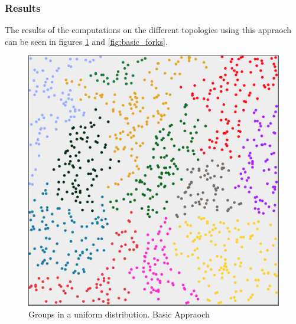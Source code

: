 \subsubsection{Results}
The results of the computations on the different topologies using this appraoch can be seen in figures \ref{fig:basic_uniform} and  \ref{fig:basic_forks}.
 
\begin{figure}[h]
	\center
	\includegraphics[scale=0.46]{Images/computations/BASIC500x500_1000n.jpg}
	\caption{Groups in a uniform distribution. Basic Appraoch}
	\label{fig:basic_uniform}
\end{figure}

